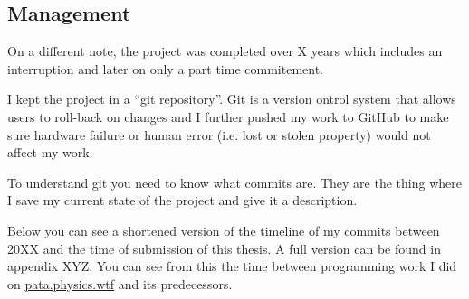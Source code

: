\subsection{Management}

On a different note, the project was completed over X years which includes an interruption and later on only a part time commitement.

I kept the project in a ``git repository''. Git is a version ontrol system that allows users to roll-back on changes and I further pushed my work to GitHub to make sure hardware failure or human error (i.e. lost or stolen property) would not affect my work. 

To understand git you need to know what commits are. They are the thing where I save my current state of the project and give it a description.

Below you can see a shortened version of the timeline of my commits between 20XX and the time of submission of this thesis. A full version can be found in appendix XYZ. You can see from this the time between programming work I did on \url{pata.physics.wtf} and its predecessors.


